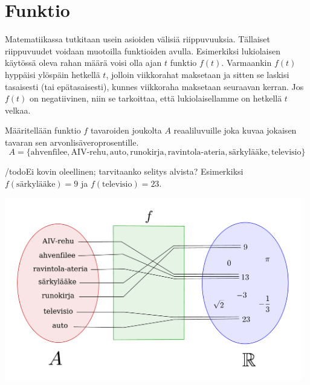 \chapter{Funktio}

Matematiikassa tutkitaan usein asioiden välisiä riippuvuuksia. Tällaiset riippuvuudet voidaan muotoilla funktioiden avulla. Esimerkiksi lukiolaisen käytössä oleva rahan määrä voisi olla ajan $t$ funktio $f(t)$.  Varmaankin $f(t)$ 
hyppäisi ylöspäin hetkellä $t$, jolloin viikkorahat maksetaan ja sitten se laskisi tasaisesti (tai epätasaisesti), kunnes viikkoraha maksetaan seuraavan kerran.  Jos $f(t)$ on negatiivinen, niin se tarkoittaa, että lukiolaisellamme on hetkellä $t$ velkaa.


\begin{esimerkki}
Määritellään funktio $f$ tavaroiden joukolta $A$ reaaliluvuille joka kuvaa jokaisen tavaran sen arvonlisäveroprosentille.
\[A = \{\text{ahvenfilee}, \text{AIV-rehu}, \text{auto}, \text{runokirja}, \text{ravintola-ateria}, \text{särkylääke}, \text{televisio}\}\]

/todo{Ei kovin oleellinen; tarvitaanko selitys alvista?}
Esimerkiksi $f(\text{särkylääke}) = 9$ ja $f(\text{televisio}) = 23$.

\begin{center}
\includegraphics[width=13cm]{03-funktiot/kuvia/funktiokone.pdf}
\end{center}
\end{esimerkki}

